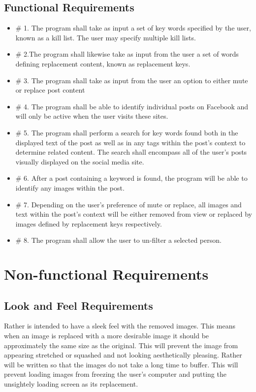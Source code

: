 \documentclass[12pt, titlepage]{article}
\begin{document}
\subsection{Functional Requirements}
\begin{itemize}
  \item \# 1. The program shall take as input a set of key words specified by the user, known as a kill list. The user may specify multiple kill lists.
  \item  \# 2.The program shall likewise take as input from the user a set of words defining replacement content, known as replacement keys.
  \item \# 3. The program shall take as input from the user an option to either mute or replace post content
  \item \# 4. The program shall be able to identify individual posts on Facebook and will only be active when the user visits these sites.
  \item \# 5. The program shall perform a search for key words found both in the displayed text of the post as well as in any tags within the post's context to determine related content. The search shall encompass all of the user's posts visually displayed on the social media site.
  \item \# 6. After a post containing a keyword is found, the program will be able to identify any images within the post.
  \item \# 7. Depending on the user's preference of mute or replace, all images and text within the post's context will be either removed from view or replaced by images defined by replacement keys respectively.
  \item \# 8. The program shall allow the user to un-filter a selected person.
\end{itemize}

\section{Non-functional Requirements}

\subsection{Look and Feel Requirements}
Rather is intended to have a sleek feel with the removed images. This means when an image is replaced with a more desirable image it should be approximately the same size as the original. This will prevent the image from appearing stretched or squashed and not looking aesthetically pleasing. Rather will be written so that the images do not take a long time to buffer. This will prevent loading images from freezing the user's computer and putting the unsightely loading screen as its replacement. 
\end{document}
